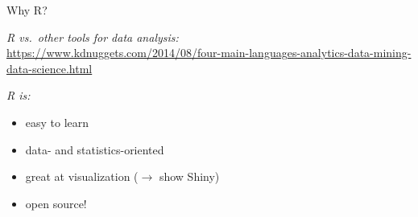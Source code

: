 \begin{frame}{Why R?}
    
    \emph{R vs.\ other tools for data analysis:}\\
    \url{https://www.kdnuggets.com/2014/08/four-main-languages-analytics-data-mining-data-science.html}
    \vspace{7pt}
    
    \emph{R is:}
    \begin{itemize}
        \item easy to learn
        \item data- and statistics-oriented
        \item great at visualization ($\rightarrow$ show Shiny)
        \item open source!
    \end{itemize}

\end{frame}